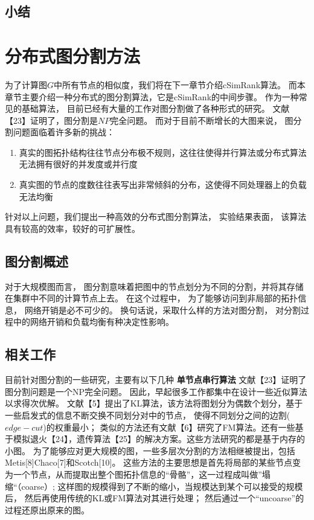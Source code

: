 \documentclass[master]{njuthesis}
\begin{document}
\section{小结}
\chapter{分布式图分割方法}\label{chapter_graphpartition}
为了计算图$G$中所有节点的相似度，我们将在下一章节介绍cSimRank算法。 而本章节主要介绍一种分布式的图分割算法，它是cSimRank的中间步骤。
作为一种常见的基础算法， 目前已经有大量的工作对图分割做了各种形式的研究。 文献【23】证明了，图分割是$NP$完全问题。
而对于目前不断增长的大图来说， 图分割问题面临着许多新的挑战：
\begin{enumerate}
 \item 真实的图拓扑结构往往节点分布极不规则，这往往使得并行算法或分布式算法无法拥有很好的并发度或并行度
 \item 真实图的节点的度数往往表写出非常倾斜的分布，这使得不同处理器上的负载无法均衡
\end{enumerate}
针对以上问题，我们提出一种高效的分布式图分割算法， 实验结果表面， 该算法具有较高的效率，较好的可扩展性。

\section{图分割概述}
对于大规模图而言， 图分割意味着把图中的节点划分为不同的分割，并将其存储在集群中不同的计算节点上去。
在这个过程中， 为了能够访问到非局部的拓扑信息， 网络开销是必不可少的。 换句话说，采取什么样的方法对图分割，
对分割过程中的网络开销和负载均衡有种决定性影响。
\section{相关工作}
目前针对图分割的一些研究，主要有以下几种
\textbf{单节点串行算法} 文献【23】证明了图分割问题是一个NP完全问题。 因此，早起很多工作都集中在设计一些近似算法以求得次优解。
文献【5】提出了KL算法，该方法将图划分为偶数个划分，基于一些启发式的信息不断交换不同划分对中的节点， 使得不同划分之间的边割($edge-cut$)的权重最小；
类似的方法还有文献【6】研究了FM算法。还有一些基于模拟退火【24】，遗传算法【25】的解决方案。这些方法研究的都是基于内存的小图。
为了能够应对更大规模的图，一些多层次分割的方法相继被提出，包括 Metis[8]Chaco[7]和Scotch[10]。
这些方法的主要思想是首先将局部的某些节点变为一个节点，从而提取出整个图拓扑信息的“骨骼”，这一过程成叫做”塌缩“（coarse）; 
这样图的规模得到了不断的缩小，当规模达到某个可以接受的规模后， 然后再使用传统的KL或FM算法对其进行处理；
然后通过一个“uncoarse”的过程还原出原来的图。
\end{document}
